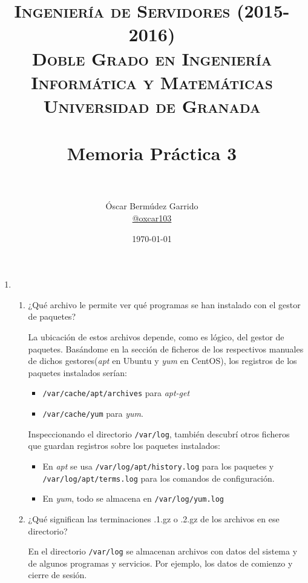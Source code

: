 \documentclass[paper=a4, fontsize=11pt]{scrartcl} %
\title{	
\normalfont \normalsize 
\textsc{{\bf Ingeniería de Servidores (2015-2016)} \\ Doble Grado en Ingeniería Informática y Matemáticas \\ Universidad de Granada} \\ [25pt] %
\horrule{0.5pt} \\[0.4cm] %
\huge Memoria Práctica 3 \\ %
\horrule{2pt} \\[0.5cm] %
}
\author{Óscar Bermúdez Garrido\\ \href{http://www.github.com/oxcar103}{@oxcar103}} %
\date{\normalsize\today} %
\numberwithin{equation}{section} %
\numberwithin{figure}{section} %
\numberwithin{table}{section} %
\begin{document}
\maketitle %
\newpage %
\tableofcontents %
\listoffigures

\begin{enumerate}
	\section{Monitorización de Sistemas Linux}
	\subsection{Conociendo el subsistema de archivos}
		\item 
		\begin{enumerate}
			\item ¿Qué archivo le permite ver qué programas se han instalado con el gestor de paquetes?
			
			La ubicación de estos archivos depende, como es lógico, del gestor de paquetes. Basándome
			en la sección de ficheros de los respectivos manuales de dichos gestores(\textit{apt}
			\cite{man_apt-get} en Ubuntu y \textit{yum}\cite{man_yum} en CentOS), los registros de los
			paquetes instalados serían:
			\begin{itemize}
				\item \verb|/var/cache/apt/archives| para \textit{apt-get}
				\item \verb|/var/cache/yum| para \textit{yum}.
			\end{itemize}
			
			Inspeccionando el directorio \verb|/var/log|, también descubrí otros ficheros que guardan
			registros sobre los paquetes instalados:
			\begin{itemize}
				\item En \textit{apt} se usa \verb|/var/log/apt/history.log| para los paquetes y
				\verb|/var/log/apt/terms.log| para los comandos de configuración.
				\item En \textit{yum}, todo  se almacena en \verb|/var/log/yum.log|
			\end{itemize}
			
			\item ¿Qué significan las terminaciones .1.gz o .2.gz de los archivos en ese directorio?
			
			En el directorio \verb|/var/log| se almacenan archivos con datos del sistema y de algunos
			programas y servicios. Por ejemplo, los datos de comienzo y cierre de sesión.\cite{dir_var}
			

\end{enumerate}
\end{enumerate}
\end{document}
